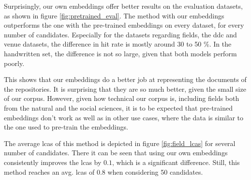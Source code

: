 Surprisingly, our own embeddings offer better results on the evaluation datasets, as shown in figure \ref{fig:pretrained_eval}. The method with our embeddings outperforms the one with the pre-trained embeddings on every dataset, for every number of candidates. Especially for the datasets regarding fields, the \acrshort{ddc} and venue datasets, the difference in hit rate is mostly around 30 to 50 \%. In the handwritten set, the difference is not so large, given that both models perform poorly.

This shows that our embeddings do a better job at representing the documents of the repositories. It is surprising that they are so much better, given the small size of our corpus. However, given how technical our corpus is, including fields both from the natural and the social sciences, it is to be expected that pre-trained embeddings don't work as well as in other use cases, where the data is similar to the one used to pre-train the embeddings.

The average \acrshort{lcas} of this method is depicted in figure \ref{fig:field_lcas} for several number of candidates. There it can be seen that using our own embeddings consistently improves the \acrshort{lcas} by $0.1$, which is a significant difference. Still, this method reaches an avg. \acrshort{lcas} of $0.8$ when considering 50 candidates.
